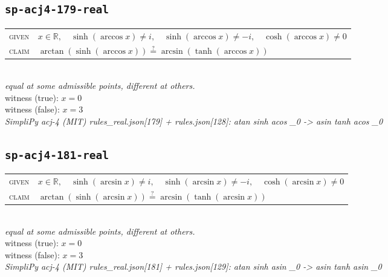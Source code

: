\documentclass[11pt]{article}
\begin{document}
\subsection*{\texttt{sp-acj4-179-real}}
\begin{tabular}{@{}l@{\quad}l@{}}
\textsc{given} & $x \in \mathbb{R},\quad \sinh\left(\arccos x\right) \neq i,\quad \sinh\left(\arccos x\right) \neq -i,\quad \cosh\left(\arccos x\right) \neq 0$ \\[4pt]
\textsc{claim} & $\displaystyle \arctan\left(\sinh\left(\arccos x\right)\right) \overset{?}{=} \arcsin\left(\tanh\left(\arccos x\right)\right)$ \\
\end{tabular}\\[2pt]
{\small\emph{equal at some admissible points, different at others.}}\\
{\footnotesize\color{gray}witness (true): $x = 0$}\\
{\footnotesize\color{gray}witness (false): $x = 3$}\\
\emph{SimpliPy acj-4 (MIT) rules\_real.json[179] + rules.json[128]: atan sinh acos \_0  ->  asin tanh acos \_0}\\

\subsection*{\texttt{sp-acj4-181-real}}
\begin{tabular}{@{}l@{\quad}l@{}}
\textsc{given} & $x \in \mathbb{R},\quad \sinh\left(\arcsin x\right) \neq i,\quad \sinh\left(\arcsin x\right) \neq -i,\quad \cosh\left(\arcsin x\right) \neq 0$ \\[4pt]
\textsc{claim} & $\displaystyle \arctan\left(\sinh\left(\arcsin x\right)\right) \overset{?}{=} \arcsin\left(\tanh\left(\arcsin x\right)\right)$ \\
\end{tabular}\\[2pt]
{\small\emph{equal at some admissible points, different at others.}}\\
{\footnotesize\color{gray}witness (true): $x = 0$}\\
{\footnotesize\color{gray}witness (false): $x = 3$}\\
\emph{SimpliPy acj-4 (MIT) rules\_real.json[181] + rules.json[129]: atan sinh asin \_0  ->  asin tanh asin \_0}\\
\end{document}
